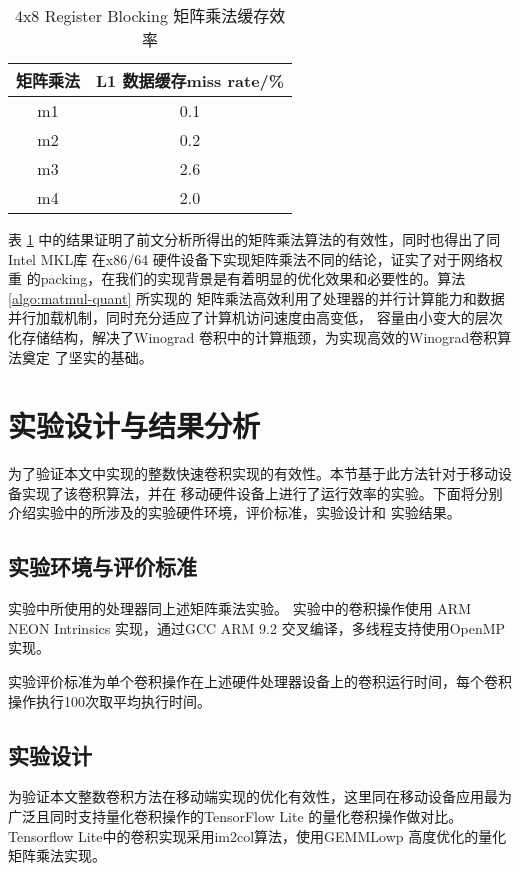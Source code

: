 \begin{table}[]
  \centering
  \caption{4x8 Register Blocking 矩阵乘法缓存效率}
  \begin{tabular}{cc}
    \toprule
    矩阵乘法 & L1 数据缓存miss rate/\% \\
    \midrule
    m1  & 0.1 \\
    m2  & 0.2 \\
    m3  & 2.6 \\
    m4  & 2.0 \\
    \bottomrule
  \end{tabular}
  \label{tbl:8x8d1mr}
\end{table}

表 \ref{tbl:8x8d1mr} 中的结果证明了前文分析所得出的矩阵乘法算法的有效性，同时也得出了同Intel MKL库
在x86/64 硬件设备下实现矩阵乘法\cite{mkl_gemm_pack}不同的结论，证实了对于网络权重
的packing，在我们的实现背景是有着明显的优化效果和必要性的。算法\ref{algo:matmul-quant} 所实现的
矩阵乘法高效利用了处理器的并行计算能力和数据并行加载机制，同时充分适应了计算机访问速度由高变低，
容量由小变大的层次化存储结构，解决了Winograd 卷积中的计算瓶颈，为实现高效的Winograd卷积算法奠定
了坚实的基础。

\section{实验设计与结果分析}

为了验证本文中实现的整数快速卷积实现的有效性。本节基于此方法针对于移动设备实现了该卷积算法，并在
移动硬件设备上进行了运行效率的实验。下面将分别介绍实验中的所涉及的实验硬件环境，评价标准，实验设计和
实验结果。

\subsection{实验环境与评价标准}

实验中所使用的处理器同上述矩阵乘法实验。 
实验中的卷积操作使用 ARM NEON Intrinsics 实现，通过GCC ARM 9.2 交叉编译，多线程支持使用OpenMP实现。

实验评价标准为单个卷积操作在上述硬件处理器设备上的卷积运行时间，每个卷积操作执行100次取平均执行时间。

\subsection{实验设计}

为验证本文整数卷积方法在移动端实现的优化有效性，这里同在移动设备应用最为广泛且同时支持量化卷积操作的TensorFlow Lite 的量化卷积操作做对比。Tensorflow Lite中的卷积实现采用im2col算法，使用GEMMLowp 高度优化的量化矩阵乘法实现。

